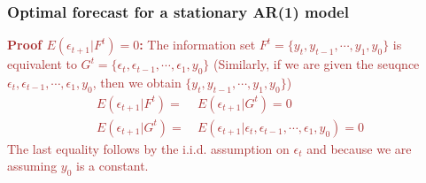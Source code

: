 \documentclass[a4paper,twoside,11pt]{article}
\begin{document}
\subsubsection{Optimal forecast for a stationary AR(1) model}
\begin{center}
\end{center}
\textcolor{Brown}{
\textbf{Proof $E(\epsilon_{t+1}|F^t) =0$:}
\newline
\newline
The information set $F^t = \{ y_t, y_{t-1} , \cdots , y_1, y_0 \}$ is equivalent to $G^t = \{ \epsilon_t, \epsilon_{t-1} , \cdots, \epsilon_1, y_0\}$
\newline
(Similarly, if we are given the seuqnce $\epsilon_t, \epsilon_{t-1}, \cdots, \epsilon_1, y_0$, then we obtain $\{y_t,  y_{t-1}, \cdots, y_1, y_0 \}$)
\begin{equation*}
\begin{aligned}
E(\epsilon_{t+1}|F^t) =& \  E(\epsilon_{t+1}|G^t) = 0 \\
E(\epsilon_{t+1}|G^t) =& \  E(\epsilon_{t+1}| \epsilon_{t}, \epsilon_{t-1}, \cdots , \epsilon_1, y_0 ) =0
\end{aligned}
\end{equation*}
The last equality follows by the i.i.d. assumption on $\epsilon_t$ and because we are assuming $y_0$ is a constant.}
\end{document}
